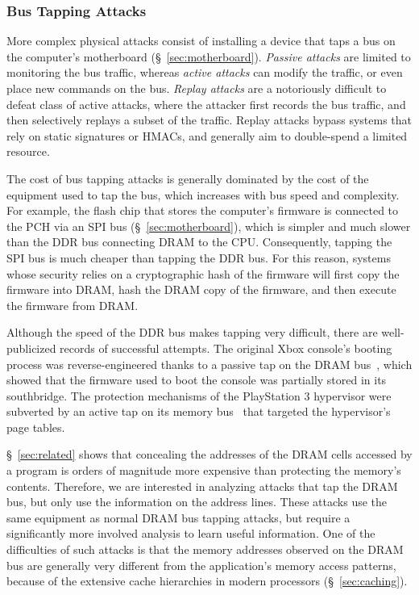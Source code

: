 \subsubsection{Bus Tapping Attacks}
\label{sec:physical_bus_attacks}

More complex physical attacks consist of installing a device that taps a bus on
the computer's motherboard (\S~\ref{sec:motherboard}). \textit{Passive attacks}
are limited to monitoring the bus traffic, whereas \textit{active attacks} can
modify the traffic, or even place new commands on the bus. \textit{Replay
attacks} are a notoriously difficult to defeat class of active attacks, where
the attacker first records the bus traffic, and then selectively replays a
subset of the traffic. Replay attacks bypass systems that rely on static
signatures or HMACs, and generally aim to double-spend a limited resource.

The cost of bus tapping attacks is generally dominated by the cost of the
equipment used to tap the bus, which increases with bus speed and complexity.
For example, the flash chip that stores the computer's firmware is connected to
the PCH via an SPI bus (\S~\ref{sec:motherboard}), which is simpler and much
slower than the DDR bus connecting DRAM to the CPU. Consequently, tapping the
SPI bus is much cheaper than tapping the DDR bus. For this reason, systems
whose security relies on a cryptographic hash of the firmware will first copy
the firmware into DRAM, hash the DRAM copy of the firmware, and then execute
the firmware from DRAM.

Although the speed of the DDR bus makes tapping very difficult, there are
well-publicized records of successful attempts. The original Xbox console's
booting process was reverse-engineered thanks to a passive tap on the DRAM
bus~\cite{huang2003xbox}, which showed that the firmware used to boot the
console was partially stored in its southbridge. The protection mechanisms of
the PlayStation 3 hypervisor were subverted by an active tap on its memory
bus~\cite{hotz2010ps3} that targeted the hypervisor's page tables.

\S~\ref{sec:related} shows that concealing the addresses of the DRAM cells
accessed by a program is orders of magnitude more expensive than protecting the
memory's contents. Therefore, we are interested in analyzing attacks that tap
the DRAM bus, but only use the information on the address lines. These attacks
use the same equipment as normal DRAM bus tapping attacks, but require a
significantly more involved analysis to learn useful information. One of the
difficulties of such attacks is that the memory addresses observed on the DRAM
bus are generally very different from the application's memory access patterns,
because of the extensive cache hierarchies in modern processors
(\S~\ref{sec:caching}).

